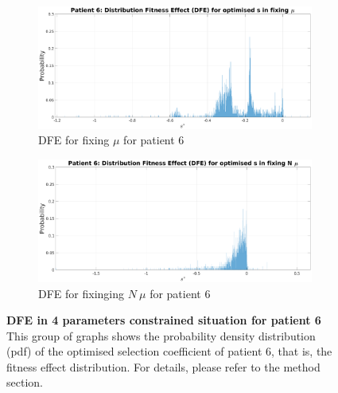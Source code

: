 \documentclass[12pt]{article}
\begin{document}
\begin{figure}[H]
    \ContinuedFloat
   
    
    \begin{subfigure}{1\textwidth}
        \includegraphics[width=\linewidth]{figures/patient/pt6/pt6_fixmu_DFE_s.eps}
        \caption{DFE for fixing $\mu$ for patient 6}
        \label{fig:subfig3}
    \end{subfigure}
    \hfill
    \begin{subfigure}{1\textwidth}
        \includegraphics[width=\linewidth]{figures/patient/pt6/pt6_fixNmu_DFE_s.eps}
        \caption{DFE for fixinging $N\ \mu$ for patient 6}
        \label{fig:subfig4}
    \end{subfigure}
    
    \caption{\textbf{DFE in 4 parameters constrained situation for patient 6} This group of graphs shows the probability density distribution (pdf) of the optimised selection coefficient of patient 6, that is, the fitness effect distribution. For details, please refer to the method section.}
    \label{fig:four_subfigs}
\end{figure}
\end{document}
